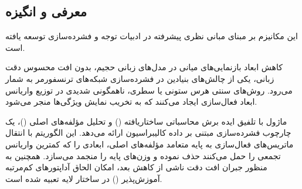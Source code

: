 \subsection{معرفی و انگیزه}
این مکانیزم بر مبنای مبانی نظری پیشرفته در ادبیات توجه و فشرده‌سازی \cite{ref_slicegptpca_2024} توسعه یافته است.

کاهش ابعاد بازنمایی‌های میانی در مدل‌های زبانی حجیم، بدون افت محسوس دقت زبانی، یکی از چالش‌های بنیادین در فشرده‌سازی شبکه‌های ترنسفورمر به شمار می‌رود. روش‌های سنتی هرس ستونی یا سطری، ناهمگونی شدیدی در توزیع واریانس ابعاد فعال‌سازی ایجاد می‌کنند که به تخریب نمایش ویژگی‌ها منجر می‌شود.

ماژول  با تلفیق ایده برش محاسباتی ساختاریافته () و تحلیل مؤلفه‌های اصلی ()، یک چارچوب فشرده‌سازی مبتنی بر داده کالیبراسیون ارائه می‌دهد. این الگوریتم با انتقال ماتریس‌های فعال‌سازی به پایه متعامد مؤلفه‌های اصلی، ابعادی را که کمترین واریانس تجمعی را حمل می‌کنند حذف نموده و وزن‌های پایه را منجمد می‌سازد. همچنین به منظور جبران افت دقت ناشی از کاهش بعد، امکان الحاق آداپتورهای کم‌مرتبه آموزش‌پذیر () در ساختار لایه تعبیه شده است.
